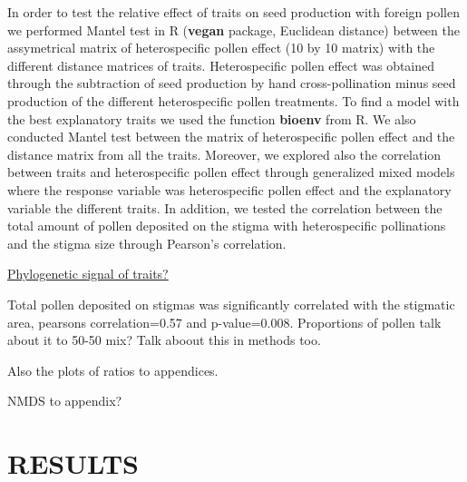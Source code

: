 \documentclass[11pt,a4paper]{article}
\begin{document}
In order to test the relative effect of traits on seed production with
foreign pollen we performed Mantel test in R (\textbf{vegan} package,
Euclidean distance) between the assymetrical matrix of heterospecific
pollen effect (10 by 10 matrix) with the different distance matrices of
traits. Heterospecific pollen effect was obtained through the
subtraction of seed production by hand cross-pollination minus seed
production of the different heterospecific pollen treatments. To find a
model with the best explanatory traits we used the function
\textbf{bioenv} from R. We also conducted Mantel test between the matrix
of heterospecific pollen effect and the distance matrix from all the
traits. Moreover, we explored also the correlation between traits and
heterospecific pollen effect through generalized mixed models where the
response variable was heterospecific pollen effect and the explanatory
variable the different traits. In addition, we tested the correlation
between the total amount of pollen deposited on the stigma with
heterospecific pollinations and the stigma size through Pearson's
correlation.

\href{Jose}{Phylogenetic signal of traits?}

Total pollen deposited on stigmas was significantly correlated with the
stigmatic area, pearsons correlation=0.57 and p-value=0.008. Proportions
of pollen talk about it to 50-50 mix? Talk aboout this in methods too.

Also the plots of ratios to appendices.

NMDS to appendix?

\section{RESULTS}\label{results}
\end{document}
